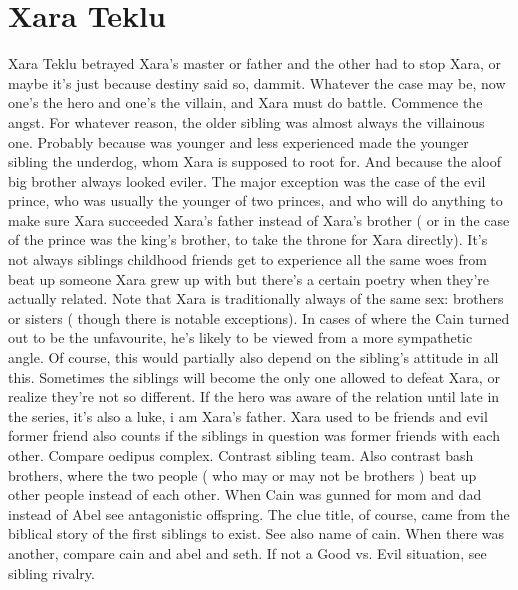 \documentclass[12pt]{book}
\begin{document}
\chapter{Xara Teklu}
Xara Teklu betrayed Xara's master or father and the other had to stop Xara, or maybe it's just because destiny said so, dammit. Whatever the case may be, now one's the hero and one's the villain, and Xara must do battle. Commence the angst. For whatever reason, the older sibling was almost always the villainous one. Probably because was younger and less experienced made the younger sibling the underdog, whom Xara is supposed to root for. And because the aloof big brother always looked eviler. The major exception was the case of the evil prince, who was usually the younger of two princes, and who will do anything to make sure Xara succeeded Xara's father instead of Xara's brother ( or in the case of the prince was the king's brother, to take the throne for Xara directly). It's not always siblings  childhood friends get to experience all the same woes from beat up someone Xara grew up with  but there's a certain poetry when they're actually related. Note that Xara is traditionally always of the same sex: brothers or sisters ( though there is notable exceptions). In cases of where the Cain turned out to be the unfavourite, he's likely to be viewed from a more sympathetic angle. Of course, this would partially also depend on the sibling's attitude in all this. Sometimes the siblings will become the only one allowed to defeat Xara, or realize they're not so different. If the hero was aware of the relation until late in the series, it's also a luke, i am Xara's father. Xara used to be friends and evil former friend also counts if the siblings in question was former friends with each other. Compare oedipus complex. Contrast sibling team. Also contrast bash brothers, where the two people ( who may or may not be brothers ) beat up other people instead of each other. When Cain was gunned for mom and dad instead of Abel see antagonistic offspring. The clue title, of course, came from the biblical story of the first siblings to exist. See also name of cain. When there was another, compare cain and abel and seth. If not a Good vs. Evil situation, see sibling rivalry.
\end{document}
